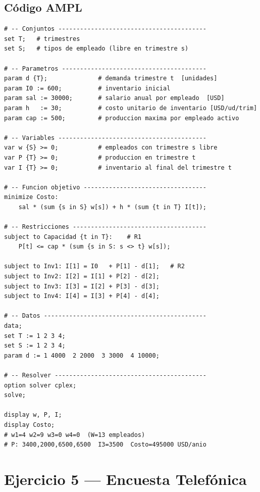 \documentclass[12pt,a4paper]{article}
\begin{document}
\subsection{Código AMPL}
\begin{lstlisting}[caption={Donovan Enterprises -- Modelo AMPL}]
# -- Conjuntos -----------------------------------------
set T;   # trimestres
set S;   # tipos de empleado (libre en trimestre s)

# -- Parametros ----------------------------------------
param d {T};              # demanda trimestre t  [unidades]
param I0 := 600;          # inventario inicial
param sal := 30000;       # salario anual por empleado  [USD]
param h   := 30;          # costo unitario de inventario [USD/ud/trim]
param cap := 500;         # produccion maxima por empleado activo

# -- Variables -----------------------------------------
var w {S} >= 0;           # empleados con trimestre s libre
var P {T} >= 0;           # produccion en trimestre t
var I {T} >= 0;           # inventario al final del trimestre t

# -- Funcion objetivo ----------------------------------
minimize Costo:
    sal * (sum {s in S} w[s]) + h * (sum {t in T} I[t]);

# -- Restricciones -------------------------------------
subject to Capacidad {t in T}:    # R1
    P[t] <= cap * (sum {s in S: s <> t} w[s]);

subject to Inv1: I[1] = I0   + P[1] - d[1];   # R2
subject to Inv2: I[2] = I[1] + P[2] - d[2];
subject to Inv3: I[3] = I[2] + P[3] - d[3];
subject to Inv4: I[4] = I[3] + P[4] - d[4];

# -- Datos ---------------------------------------------
data;
set T := 1 2 3 4;
set S := 1 2 3 4;
param d := 1 4000  2 2000  3 3000  4 10000;

# -- Resolver ------------------------------------------
option solver cplex;
solve;

display w, P, I;
display Costo;
# w1=4 w2=9 w3=0 w4=0  (W=13 empleados)
# P: 3400,2000,6500,6500  I3=3500  Costo=495000 USD/anio
\end{lstlisting}

\clearpage
\section{Ejercicio 5 — Encuesta Telefónica}
\end{document}
